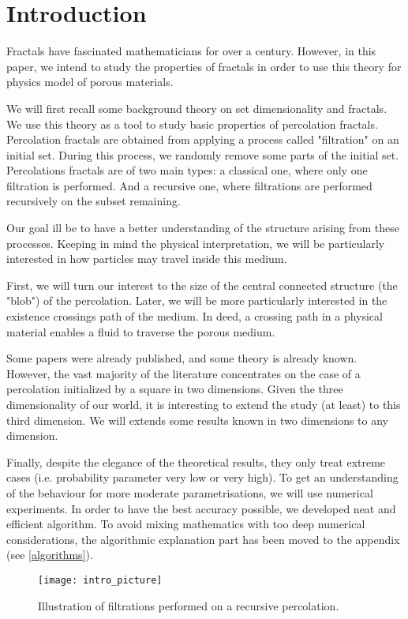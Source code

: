 \setcounter{section}{-1}
\section{Introduction}

Fractals have fascinated mathematicians for over a century.
However, in this paper, we intend to study the properties of fractals in order to use this theory for physics model of porous materials.

We will first recall some background theory on set dimensionality and fractals.
We use this theory as a tool to study basic properties of percolation fractals.
Percolation fractals are obtained from applying a process called "filtration" on an initial set.
During this process, we randomly remove some parts of the initial set.
Percolations fractals are of two main types: a classical one, where only one filtration is performed. And a recursive one, where filtrations are performed recursively on the subset remaining.

Our goal ill be to have a better understanding of the structure arising from these processes.
Keeping in mind the physical interpretation, we will be particularly interested in how particles may travel inside this medium.

First, we will turn our interest to the size of the central connected structure (the "blob") of the percolation.
Later, we will be more particularly interested in the existence crossings path of the medium.
In deed, a crossing path in a physical material enables a fluid to traverse the porous medium.

Some papers were already published, and some theory is already known.
However, the vast majority of the literature concentrates on the case of a percolation initialized by a square in two dimensions.
Given the three dimensionality of our world, it is interesting to extend the study (at least) to this third dimension.
We will extends some results known in two dimensions to any dimension.

Finally, despite the elegance of the theoretical results, they only treat extreme cases (i.e. probability parameter very low or very high).
To get an understanding of the behaviour for more moderate parametrisations, we will use numerical experiments.
In order to have the best accuracy possible, we developed neat and efficient algorithm.
To avoid mixing mathematics with too deep numerical considerations, the algorithmic explanation part has been moved to the appendix (see \ref{algorithms}).

\begin{figure}[!h]
	\texttt{[image: intro\_picture]}
	\centering
	\caption{Illustration of filtrations performed on a recursive percolation.}
	\label{fig:introRecursivePercolation}
\end{figure}

